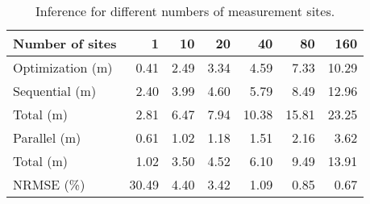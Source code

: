 \begin{table*}
  \centering
  \caption{Inference for different numbers of measurement sites.}
  \ttfamily
  \begin{tabular}{lrrrrrr}
    \toprule
    \textnormal{Number of sites}  &     1 &   10 &   20 &    40 &    80 &   160 \\
    \midrule
    \textnormal{Optimization (m)} &  0.41 & 2.49 & 3.34 &  4.59 &  7.33 & 10.29 \\
    \midrule
    \textnormal{Sequential (m)}   &  2.40 & 3.99 & 4.60 &  5.79 &  8.49 & 12.96 \\
    \textnormal{Total (m)}        &  2.81 & 6.47 & 7.94 & 10.38 & 15.81 & 23.25 \\
    \midrule
    \textnormal{Parallel (m)}     &  0.61 & 1.02 & 1.18 &  1.51 &  2.16 &  3.62 \\
    \textnormal{Total (m)}        &  1.02 & 3.50 & 4.52 &  6.10 &  9.49 & 13.91 \\
    \midrule
    \textnormal{\ac{NRMSE} (\%)}  & 30.49 & 4.40 & 3.42 &  1.09 &  0.85 &  0.67 \\
    \bottomrule
  \end{tabular}
\end{table*}
